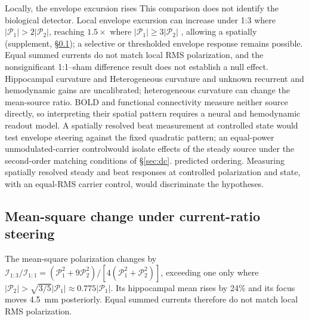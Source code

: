 \documentclass[11pt,a4paper]{article}
\newif\ifjne
\providecommand{\DIFaddtex}[1]{{\protect\color{blue} \sf #1}} %
\providecommand{\DIFdeltex}[1]{{\protect\color{red} \scriptsize #1}} %
\providecommand{\DIFaddbegin}{} %
\providecommand{\DIFaddend}{} %
\providecommand{\DIFdelbegin}{} %
\providecommand{\DIFdelend}{} %
\providecommand{\DIFadd}[1]{\texorpdfstring{\DIFaddtex{#1}}{#1}} %
\providecommand{\DIFdel}[1]{\texorpdfstring{\DIFdeltex{#1}}{}} %
\begin{document}
\DIFdelbegin \DIFdel{Locally, the envelope excursion rises }\DIFdelend \DIFaddbegin \DIFadd{This comparison does not identify the biological detector. Local envelope
excursion can increase under 1:3 }\DIFaddend where $|\mathcal P_1|>2|\mathcal P_2|$,
reaching $1.5\times$ where $|\mathcal P_1|\geq3|\mathcal P_2|$ \DIFdelbegin \DIFdel{,
allowing a spatially }\DIFdelend \DIFaddbegin \DIFadd{(supplement,
\S\ref{supp:steering-algebra}); a }\DIFaddend selective or thresholded envelope response
\DIFaddbegin \DIFadd{remains possible. Equal summed currents do not match local RMS polarization}\DIFaddend ,
and the nonsignificant 1:1--sham \DIFdelbegin \DIFdel{difference
}\DIFdelend \DIFaddbegin \DIFadd{result }\DIFaddend does not establish a null effect.
\DIFdelbegin \DIFdel{Hippocampal curvature and }\DIFdelend \DIFaddbegin \DIFadd{Heterogeneous curvature and unknown }\DIFaddend recurrent and hemodynamic gains \DIFdelbegin \DIFdel{are uncalibrated;
heterogeneous curvature }\DIFdelend can change
the \DIFdelbegin \DIFdel{mean-source ratio. BOLD and functional
connectivity measure neither source directly, so interpreting their spatial
pattern requires a neural and hemodynamic readout model. A spatially resolved beat measurement at controlled state would
test envelope steering against the fixed quadratic pattern; an equal-power
unmodulated-carrier controlwould isolate effects of the steady source under
the second-order matching conditions of \S\ref{sec:dc}.
}\DIFdelend \DIFaddbegin \DIFadd{predicted ordering. Measuring spatially resolved steady and beat responses
at controlled polarization and state, with an equal-RMS carrier control,
would discriminate the hypotheses.
}\ifjne\else
\subsection{\DIFadd{Mean-square change under current-ratio steering}}\label{supp:steering-algebra}
\DIFadd{The mean-square polarization
changes by $\mathcal I_{1:3}/\mathcal I_{1:1}
=(\mathcal P_1^2+9\mathcal P_2^2)/[4(\mathcal P_1^2+\mathcal P_2^2)]$,
exceeding one only where $|\mathcal P_2|>\sqrt{3/5}|\mathcal P_1|
\approx0.775|\mathcal P_1|$. Its hippocampal mean rises by 24\% and its focus
moves 4.5~mm posteriorly. Equal summed currents therefore do not match local
RMS polarization.
}\DIFaddend

\DIFaddbegin \fi
\end{document}
